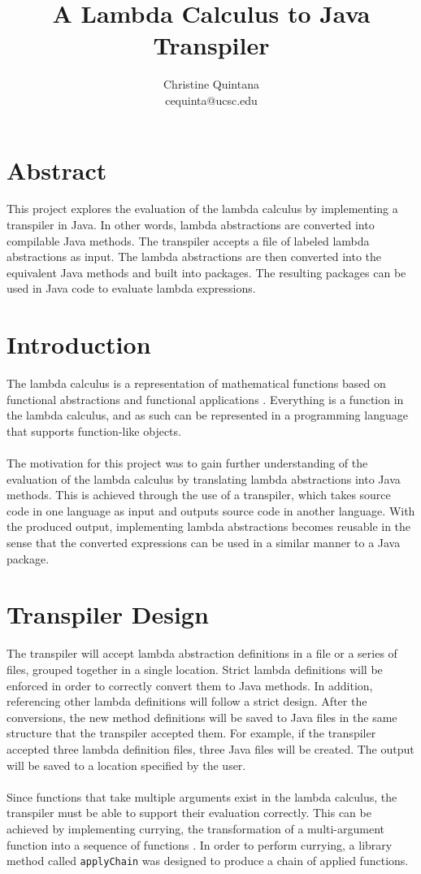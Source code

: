 \documentclass[11pt]{article}
\title{\textbf{A Lambda Calculus to Java Transpiler}}
\author{Christine Quintana\\\small{cequinta@ucsc.edu}}
\date{}
\begin{document}
\maketitle

\section*{Abstract}
This project explores the evaluation of the lambda calculus by implementing a transpiler in Java. In other words, lambda abstractions are converted into compilable Java methods. The transpiler accepts a file of labeled lambda abstractions as input. The lambda abstractions are then converted into the equivalent Java methods and built into packages. The resulting packages can be used in Java code to evaluate lambda expressions. 

\section{Introduction}

The lambda calculus is a representation of mathematical functions based on functional abstractions and functional applications \cite{church}. Everything is a function in the lambda calculus, and as such can be represented in a programming language that supports function-like objects.
\\
\\
The motivation for this project was to gain further understanding of the evaluation of the lambda calculus by translating lambda abstractions into Java methods. This is achieved through the use of a transpiler, which takes source code in one language as input and outputs source code in another language. With the produced output, implementing lambda abstractions becomes reusable in the sense that the converted expressions can be used in a similar manner to a Java package.

\section{Transpiler Design}

The transpiler will accept lambda abstraction definitions in a file or a series of files, grouped together in a single location. Strict lambda definitions will be enforced in order to correctly convert them to Java methods. In addition, referencing other lambda definitions will follow a strict design. After the conversions, the new method definitions will be saved to Java files in the same structure that the transpiler accepted them. For example, if the transpiler accepted three lambda definition files, three Java files will be created. The output will be saved to a location specified by the user.
\\
\\
Since functions that take multiple arguments exist in the lambda calculus, the transpiler must be able to support their evaluation correctly. This can be achieved by implementing currying, the transformation of a multi-argument function into a sequence of functions \cite{tapl}. In order to perform currying, a library method called \texttt{applyChain} was designed to produce a chain of applied functions.
\end{document}
